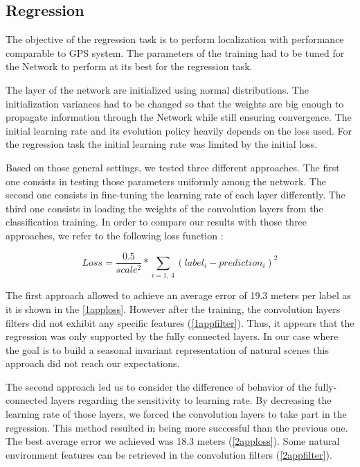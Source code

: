 \subsection{Regression}
The objective of the regression task is to perform localization with performance comparable to GPS system. The parameters of the training had to be tuned for the Network to perform at its best for the regression task.

The layer of the network are initialized using normal distributions. The initialization variances had to be changed so that the weights are big enough to propagate information through the Network while still ensuring convergence.
The initial learning rate and its evolution policy heavily depends on the loss used. For the regression task the initial learning rate was limited by the initial loss.

Based on those general settings, we tested three different approaches. The first one consists in testing those parameters uniformly among the network. The second one consists in fine-tuning the learning rate of each layer differently. The third one consists in loading the weights of the convolution layers from the classification training. In order to compare our results with those three approaches, we refer to the following loss function :

\begin{equation} 
Loss = \frac{0.5}{scale^{2}}*\sum_{i=1,\ 4}(label_{i}-prediction_{i})^{2}
\end{equation}

The first approach allowed to achieve an average error of 19.3 meters per label as it is shown in the \ref{1apploss}. However after the training, the convolution layers filters did not exhibit any specific features (\ref{1appfilter}). Thus, it appears that the regression was only supported by the fully connected layers. In our case where the goal is to build a seasonal invariant representation of natural scenes this approach did not reach our expectations. 

The second approach led us to consider the difference of behavior of the fully-connected layers regarding the sensitivity to learning rate. By decreasing the learning rate of those layers, we forced the convolution layers to take part in the regression. This method resulted in being more successful than the previous one. The best average error we achieved was 18.3 meters (\ref{2apploss}). Some natural environment features can be retrieved in the convolution filters (\ref{2appfilter}).

